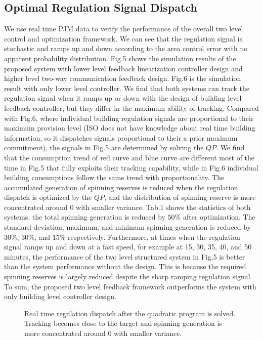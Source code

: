 \documentclass[journal]{IEEEtran}
\begin{document}
\subsection{Optimal Regulation Signal Dispatch}
We use real time PJM data \cite{realsignal} to verify the performance of the overall two level control and optimization framework. We can see that the regulation signal is stochastic and ramps up and down according to the area control error with no apparent probability distribution. Fig.5 shows the simulation results of the proposed system with lower level feedback linearization controller design and higher level two-way communication feedback design. Fig.6 is the simulation result with only lower level controller. We find that both systems can track the regulation signal when it ramps up or down with the design of building level feedback controller, but they differ in the maximum ability of tracking. Compared with Fig.6, where individual building regulation signals are proportional to their maximum provision level (ISO does not have knowledge about real time building information, so it dispatches signals proportional to their a prior maximum commitment), the signals in Fig.5 are determined by solving the $QP$. We find that the consumption trend of red curve and blue curve are different most of the time in Fig.5 that fully exploits their tracking capability, while in Fig.6 individual building consumptions follow the same trend with proportionality. The accumulated generation of spinning reserves is reduced when the regulation dispatch is optimized by the $QP$, and the distribution of spinning reserve is more concentrated around $0$ with smaller variance. Tab.1 shows the statistics of both systems, the total spinning generation is reduced by $50\%$ after optimization. The standard deviation, maximum, and minimum spinning generation is reduced by $30\%$, $30\%$, and $15\%$ respectively. Furthermore, at times when the regulation signal ramps up and down at a fast speed, for example at 15, 30, 35, 40, and 50 minutes, the performance of the two level structured system in Fig.5 is better than the system performance without the design. This is because the required spinning reserves is largely reduced despite the sharp ramping regulation signal. To sum, the proposed two level feedback framework outperforms the system with only building level controller design.
\begin{figure}[hbt]
\centering
{}
\label{opt_result}
\caption{Real time regulation dispatch after the quadratic program is solved. Tracking becomes close to the target and spinning generation is more concentrated around 0 with smaller variance.}
\end{figure}
\end{document}
